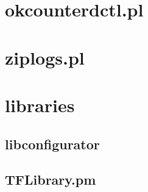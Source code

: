 \documentclass[11pt,a4paper,openany,oneside]{book}
\begin{document}
\section{okcounterdctl.pl}

\section{ziplogs.pl}



\section{libraries}

\subsection{libconfigurator}

\subsection{TFLibrary.pm}
\end{document}
